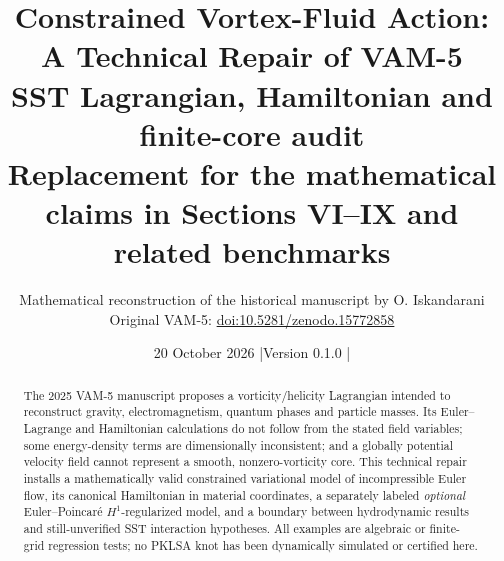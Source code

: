 \documentclass[11pt,a4paper]{article}
\title{\textbf{Constrained Vortex-Fluid Action: A Technical Repair of VAM-5}\\[0.4em]
\large SST Lagrangian, Hamiltonian and finite-core audit\\[0.4em]
\normalsize Replacement for the mathematical claims in Sections VI--IX and related benchmarks}
\author{Mathematical reconstruction of the historical manuscript by O. Iskandarani\\ \small Original VAM-5: \href{https://doi.org/10.5281/zenodo.15772858}{doi:10.5281/zenodo.15772858}}
\date{20 October 2026 \quad|\quad Version 0.1.0 \quad|\quad \status{DEVELOPMENT / NOT PHYSICALLY CERTIFIED}}
\begin{document}
\maketitle
\begin{abstract}
The 2025 VAM-5 manuscript proposes a vorticity/helicity Lagrangian intended to reconstruct gravity, electromagnetism, quantum phases and particle masses. Its Euler--Lagrange and Hamiltonian calculations do not follow from the stated field variables; some energy-density terms are dimensionally inconsistent; and a globally potential velocity field cannot represent a smooth, nonzero-vorticity core. This technical repair installs a mathematically valid constrained variational model of incompressible Euler flow, its canonical Hamiltonian in material coordinates, a separately labeled \emph{optional} Euler--Poincar\'e $H^1$-regularized model, and a boundary between hydrodynamic results and still-unverified SST interaction hypotheses. All examples are algebraic or finite-grid regression tests; no PKLSA knot has been dynamically simulated or certified here.
\end{abstract}
\setcounter{tocdepth}{1}
\tableofcontents
\newpage
\end{document}
